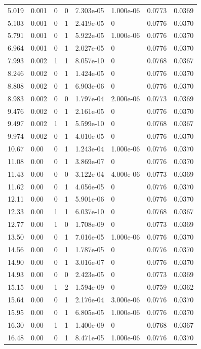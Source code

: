 \documentclass[preview]{standalone}
\begin{document}
{{\begin{tabular}{L{1.2cm}C{1.2cm} C{0.3cm}C{0.5cm} C{1.4cm}C{1.4cm} C{1.4cm}C{1.4cm}}
  5.019  &  0.001  & 0     &  0 &  7.303e-05  & 1.000e-06  & 0.0773 &  0.0369   \\ 
  5.103  &  0.001  & 0     &  1 &  2.419e-05  & 0  & 0.0776 &  0.0370   \\ 
  5.791  &  0.001  & 0     &  1 &  5.922e-05  & 1.000e-06  & 0.0776 &  0.0370   \\ 
  6.964  &  0.001  & 0     &  1 &  2.027e-05  & 0  & 0.0776 &  0.0370   \\ 
  7.993  &  0.002  & 1     &  1 &  8.057e-10  & 0  & 0.0768 &  0.0367   \\ 
  8.246  &  0.002  & 0     &  1 &  1.424e-05  & 0  & 0.0776 &  0.0370   \\ 
  8.808  &  0.002  & 0     &  1 &  6.903e-06  & 0  & 0.0776 &  0.0370   \\ 
  8.983  &  0.002  & 0     &  0 &  1.797e-04  & 2.000e-06  & 0.0773 &  0.0369   \\ 
  9.476  &  0.002  & 0     &  1 &  2.161e-05  & 0  & 0.0776 &  0.0370   \\ 
  9.497  &  0.002  & 1     &  1 &  5.599e-10  & 0  & 0.0768 &  0.0367   \\ 
  9.974  &  0.002  & 0     &  1 &  4.010e-05  & 0  & 0.0776 &  0.0370   \\ 
  10.67  &  0.00  & 0     &  1 &  1.243e-04  & 1.000e-06  & 0.0776 &  0.0370   \\ 
  11.08  &  0.00  & 0     &  1 &  3.869e-07  & 0  & 0.0776 &  0.0370   \\ 
  11.43  &  0.00  & 0     &  0 &  3.122e-04  & 4.000e-06  & 0.0773 &  0.0369   \\ 
  11.62  &  0.00  & 0     &  1 &  4.056e-05  & 0  & 0.0776 &  0.0370   \\ 
  12.11  &  0.00  & 0     &  1 &  5.901e-06  & 0  & 0.0776 &  0.0370   \\ 
  12.33  &  0.00  & 1     &  1 &  6.037e-10  & 0  & 0.0768 &  0.0367   \\ 
  12.77  &  0.00  & 1     &  0 &  1.708e-09  & 0  & 0.0773 &  0.0369   \\ 
  13.50  &  0.00  & 0     &  1 &  7.016e-05  & 1.000e-06  & 0.0776 &  0.0370   \\ 
  14.56  &  0.00  & 0     &  1 &  1.787e-05  & 0  & 0.0776 &  0.0370   \\ 
  14.90  &  0.00  & 0     &  1 &  3.016e-07  & 0  & 0.0776 &  0.0370   \\ 
  14.93  &  0.00  & 0     &  0 &  2.423e-05  & 0  & 0.0773 &  0.0369   \\ 
  15.15  &  0.00  & 1     &  2 &  1.594e-09  & 0  & 0.0759 &  0.0362   \\ 
  15.64  &  0.00  & 0     &  1 &  2.176e-04  & 3.000e-06  & 0.0776 &  0.0370   \\ 
  15.95  &  0.00  & 0     &  1 &  6.805e-05  & 1.000e-06  & 0.0776 &  0.0370   \\ 
  16.30  &  0.00  & 1     &  1 &  1.400e-09  & 0  & 0.0768 &  0.0367   \\ 
  16.48  &  0.00  & 0     &  1 &  8.471e-05  & 1.000e-06  & 0.0776 &  0.0370   \\ 
\hline 
\end{tabular} 

}}
\end{document}
